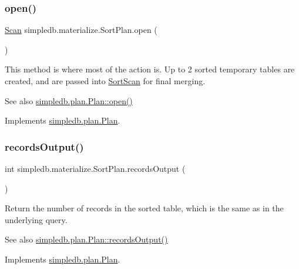 \subsubsection{\texorpdfstring{open()}{open()}}
{\footnotesize\ttfamily \hyperlink{interfacesimpledb_1_1query_1_1Scan}{Scan} simpledb.\+materialize.\+Sort\+Plan.\+open (\begin{DoxyParamCaption}{ }\end{DoxyParamCaption})\hspace{0.3cm}{\ttfamily [inline]}}

This method is where most of the action is. Up to 2 sorted temporary tables are created, and are passed into \hyperlink{classsimpledb_1_1materialize_1_1SortScan}{Sort\+Scan} for final merging. \begin{DoxySeeAlso}{See also}
\hyperlink{interfacesimpledb_1_1plan_1_1Plan_aaa4c15cda4e9c0d52308850f9f13ff99}{simpledb.\+plan.\+Plan\+::open()} 
\end{DoxySeeAlso}


Implements \hyperlink{interfacesimpledb_1_1plan_1_1Plan_aaa4c15cda4e9c0d52308850f9f13ff99}{simpledb.\+plan.\+Plan}.

\mbox{\label{classsimpledb_1_1materialize_1_1SortPlan_a1bcfa71f5e5f33c4bd484d68b6121fbd}} 
\subsubsection{\texorpdfstring{records\+Output()}{recordsOutput()}}
{\footnotesize\ttfamily int simpledb.\+materialize.\+Sort\+Plan.\+records\+Output (\begin{DoxyParamCaption}{ }\end{DoxyParamCaption})\hspace{0.3cm}{\ttfamily [inline]}}

Return the number of records in the sorted table, which is the same as in the underlying query. \begin{DoxySeeAlso}{See also}
\hyperlink{interfacesimpledb_1_1plan_1_1Plan_a187e06657d356c80a7f743d7ff8fd257}{simpledb.\+plan.\+Plan\+::records\+Output()} 
\end{DoxySeeAlso}


Implements \hyperlink{interfacesimpledb_1_1plan_1_1Plan_a187e06657d356c80a7f743d7ff8fd257}{simpledb.\+plan.\+Plan}.

